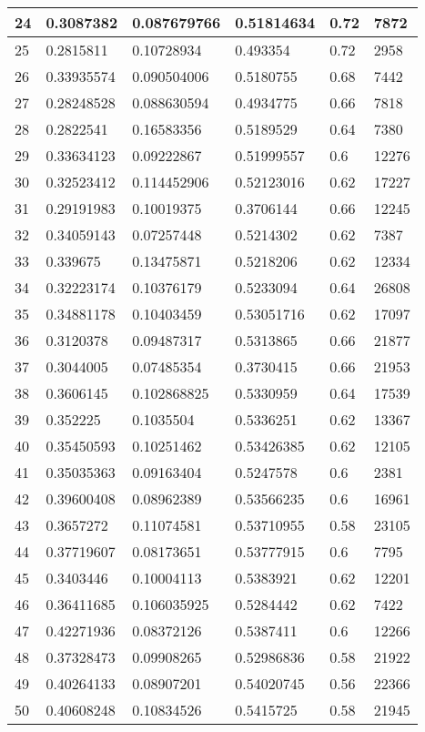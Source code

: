 \begin{longtable}{|l|l|l|l|l|l|}
24 & 0.3087382 & 0.087679766 & 0.51814634 & 0.72 & 7872 \\ \hline 
25 & 0.2815811 & 0.10728934 & 0.493354 & 0.72 & 2958 \\ \hline 
26 & 0.33935574 & 0.090504006 & 0.5180755 & 0.68 & 7442 \\ \hline 
27 & 0.28248528 & 0.088630594 & 0.4934775 & 0.66 & 7818 \\ \hline 
28 & 0.2822541 & 0.16583356 & 0.5189529 & 0.64 & 7380 \\ \hline 
29 & 0.33634123 & 0.09222867 & 0.51999557 & 0.6 & 12276 \\ \hline 
30 & 0.32523412 & 0.114452906 & 0.52123016 & 0.62 & 17227 \\ \hline 
31 & 0.29191983 & 0.10019375 & 0.3706144 & 0.66 & 12245 \\ \hline 
32 & 0.34059143 & 0.07257448 & 0.5214302 & 0.62 & 7387 \\ \hline 
33 & 0.339675 & 0.13475871 & 0.5218206 & 0.62 & 12334 \\ \hline 
34 & 0.32223174 & 0.10376179 & 0.5233094 & 0.64 & 26808 \\ \hline 
35 & 0.34881178 & 0.10403459 & 0.53051716 & 0.62 & 17097 \\ \hline 
36 & 0.3120378 & 0.09487317 & 0.5313865 & 0.66 & 21877 \\ \hline 
37 & 0.3044005 & 0.07485354 & 0.3730415 & 0.66 & 21953 \\ \hline 
38 & 0.3606145 & 0.102868825 & 0.5330959 & 0.64 & 17539 \\ \hline 
39 & 0.352225 & 0.1035504 & 0.5336251 & 0.62 & 13367 \\ \hline 
40 & 0.35450593 & 0.10251462 & 0.53426385 & 0.62 & 12105 \\ \hline 
41 & 0.35035363 & 0.09163404 & 0.5247578 & 0.6 & 2381 \\ \hline 
42 & 0.39600408 & 0.08962389 & 0.53566235 & 0.6 & 16961 \\ \hline 
43 & 0.3657272 & 0.11074581 & 0.53710955 & 0.58 & 23105 \\ \hline 
44 & 0.37719607 & 0.08173651 & 0.53777915 & 0.6 & 7795 \\ \hline 
45 & 0.3403446 & 0.10004113 & 0.5383921 & 0.62 & 12201 \\ \hline 
46 & 0.36411685 & 0.106035925 & 0.5284442 & 0.62 & 7422 \\ \hline 
47 & 0.42271936 & 0.08372126 & 0.5387411 & 0.6 & 12266 \\ \hline 
48 & 0.37328473 & 0.09908265 & 0.52986836 & 0.58 & 21922 \\ \hline 
49 & 0.40264133 & 0.08907201 & 0.54020745 & 0.56 & 22366 \\ \hline 
50 & 0.40608248 & 0.10834526 & 0.5415725 & 0.58 & 21945 \\ \hline 
\end{longtable}